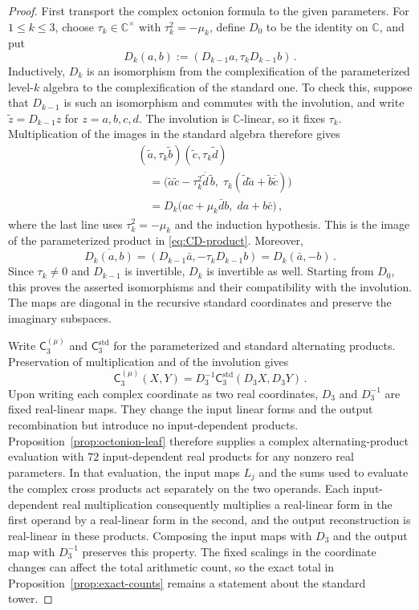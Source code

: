 \documentclass[11pt,reqno]{amsart}
\numberwithin{equation}{section}
\newcommand{\C}{\mathbb C}
\newcommand{\AltC}{\mathsf C}
\begin{document}
\begin{proof}
First transport the complex octonion formula to the given parameters.
For $1\le k\le3$, choose $\tau_k\in\C^\times$ with
$\tau_k^2=-\mu_k$, define $D_0$ to be the identity on $\C$, and put
\[
D_k(a,b):=(D_{k-1}a,\tau_kD_{k-1}b)\,.
\]
Inductively, $D_k$ is an isomorphism from the complexification of the
parameterized level-$k$ algebra to the complexification of the standard
one. To check this, suppose that $D_{k-1}$ is such an isomorphism and
commutes with the involution, and write $\widetilde z=D_{k-1}z$ for
$z=a,b,c,d$. The involution is $\C$-linear, so it fixes $\tau_k$.
Multiplication of the images in the standard algebra therefore gives
\[
\begin{aligned}
&(\widetilde a,\tau_k\widetilde b)
 (\widetilde c,\tau_k\widetilde d)\\
&\quad=
 \bigl(\widetilde a\widetilde c
       -\tau_k^2\overline{\widetilde d}\,\widetilde b,\;
       \tau_k(\widetilde d\widetilde a
                   +\widetilde b\overline{\widetilde c})\bigr)\\
&\quad=D_k\bigl(ac+\mu_k\bar d b,\;da+b\bar c\bigr)\,,
\end{aligned}
\]
where the last line uses $\tau_k^2=-\mu_k$ and the induction
hypothesis. This is the image of the parameterized product in
\eqref{eq:CD-product}. Moreover,
\[
\overline{D_k(a,b)}
=(D_{k-1}\bar a,-\tau_kD_{k-1}b)
=D_k(\bar a,-b)\,.
\]
Since $\tau_k\ne0$ and $D_{k-1}$ is invertible, $D_k$ is invertible
as well. Starting from $D_0$, this proves the asserted isomorphisms and
their compatibility with the involution. The maps are diagonal in the
recursive standard coordinates and preserve the imaginary subspaces.

Write $\AltC_3^{(\mu)}$ and $\AltC_3^{\mathrm{std}}$ for the
parameterized and standard alternating products. Preservation of
multiplication and of the involution gives
\[
\AltC_3^{(\mu)}(X,Y)
=D_3^{-1}\AltC_3^{\mathrm{std}}(D_3X,D_3Y)\,.
\]
Upon writing each complex coordinate as two real coordinates, $D_3$ and
$D_3^{-1}$ are fixed real-linear maps. They change the input linear
forms and the output recombination but introduce no input-dependent
products. Proposition~\ref{prop:octonion-leaf} therefore supplies a
complex alternating-product evaluation with $72$ input-dependent real
products for any nonzero real parameters. In that evaluation, the input
maps $L_j$ and the sums used to evaluate the complex cross products act
separately on the two operands. Each input-dependent real multiplication
consequently multiplies a real-linear form in the first operand by a
real-linear form in the second, and the output reconstruction is
real-linear in these products. Composing the input maps with $D_3$ and
the output map with
$D_3^{-1}$ preserves this property. The fixed scalings in the
coordinate changes can affect the total arithmetic count, so the exact
total in Proposition~\ref{prop:exact-counts} remains a statement about
the standard tower.


\end{proof}
\end{document}
